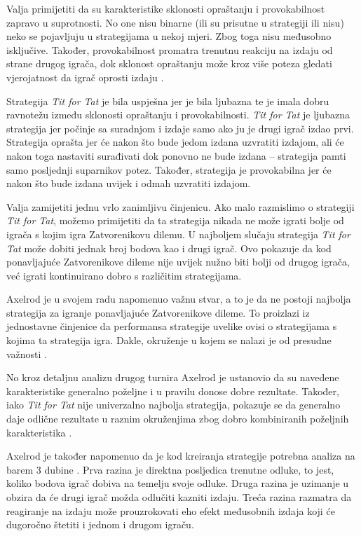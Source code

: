 \documentclass[zavrsnirad]{fer}
\begin{document}
		Valja primijetiti da su karakteristike sklonosti opraštanju i provokabilnost zapravo u suprotnosti. No one nisu binarne (ili su prisutne u strategiji ili nisu) neko se pojavljuju u strategijama u nekoj mjeri. Zbog toga nisu međusobno isključive. Također, provokabilnost promatra trenutnu reakciju na izdaju od strane drugog igrača, dok sklonost opraštanju može kroz više poteza gledati vjerojatnost da igrač oprosti izdaju \cite{1980Axelrod2}.
	
		Strategija \textit{Tit for Tat} je bila uspješna jer je bila ljubazna te je imala dobru ravnotežu između sklonosti opraštanju i provokabilnosti. \textit{Tit for Tat} je ljubazna strategija jer počinje sa suradnjom i izdaje samo ako ju je drugi igrač izdao prvi. Strategija oprašta jer će nakon što bude jedom izdana uzvratiti izdajom, ali će nakon toga nastaviti surađivati dok ponovno ne bude izdana -- strategija pamti samo posljednji suparnikov potez. Također, strategija je provokabilna jer će nakon što bude izdana uvijek i odmah uzvratiti izdajom.
		
		Valja zamijetiti jednu vrlo zanimljivu činjenicu. Ako malo razmislimo o strategiji \textit{Tit for Tat}, možemo primijetiti da ta strategija nikada ne može igrati bolje od igrača s kojim igra Zatvorenikovu dilemu. U najboljem slučaju strategija \textit{Tit for Tat} može dobiti jednak broj bodova kao i drugi igrač. Ovo pokazuje da kod ponavljajuće Zatvorenikove dileme nije uvijek nužno biti bolji od drugog igrača, već igrati kontinuirano dobro s različitim strategijama. 
	
		Axelrod je u svojem radu napomenuo važnu stvar, a to je da ne postoji najbolja strategija za igranje ponavljajuće Zatvorenikove dileme. To proizlazi iz jednostavne činjenice da performansa strategije uvelike ovisi o strategijama s kojima ta strategija igra. Dakle, okruženje u kojem se nalazi je od presudne važnosti \cite{1980Axelrod1}.
	
		No kroz detaljnu analizu drugog turnira Axelrod je ustanovio da su navedene karakteristike generalno poželjne i u pravilu donose dobre rezultate. Također, iako \textit{Tit for Tat} nije univerzalno najbolja strategija, pokazuje se da generalno daje odlične rezultate u raznim okruženjima zbog dobro kombiniranih poželjnih karakteristika \cite{1980Axelrod2}.
	
		Axelrod je također napomenuo da je kod kreiranja strategije potrebna analiza na barem 3 dubine \cite{1980Axelrod1}. Prva razina je direktna posljedica trenutne odluke, to jest, koliko bodova igrač dobiva na temelju svoje odluke. Druga razina je uzimanje u obzira da će drugi igrač možda odlučiti kazniti izdaju. Treća razina razmatra da reagiranje na izdaju može prouzrokovati eho efekt međusobnih izdaja koji će dugoročno štetiti i jednom i drugom igraču.
\end{document}
